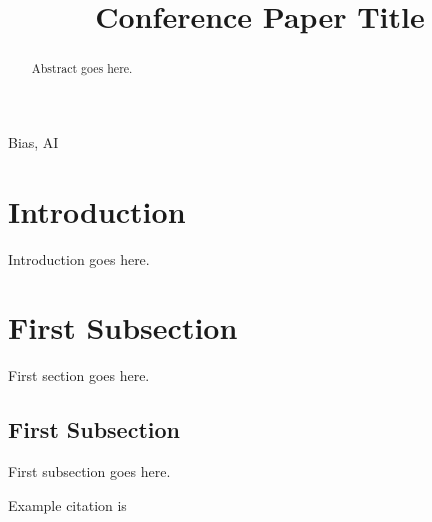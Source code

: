 \documentclass[conference]{IEEEtran}
\begin{document}
\title{Conference Paper Title}

\author{
}

\maketitle

\begin{abstract}
Abstract goes here.
\end{abstract}

\begin{IEEEkeywords}
Bias, AI
\end{IEEEkeywords}

\section{Introduction}
Introduction goes here.

\section{First Subsection}

First section goes here.
\subsection{First Subsection}

First subsection goes here.

Example citation is \cite{DBLP:journals/corr/HeZRS15}



\end{document}

